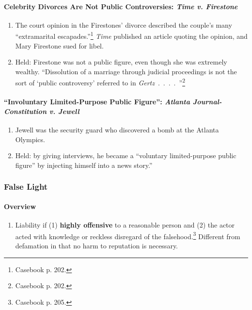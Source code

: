 \paragraph{Celebrity Divorces Are Not Public Controversies: \emph{Time v.  
Firestone}}

\begin{enumerate}
    \item The court opinion in the Firestones' divorce described the couple's 
    many ``extramarital escapades.''\footnote{Casebook p. 202.} \emph{Time} 
    published an article quoting the opinion, and Mary Firestone sued for libel.
    \item Held: Firestone was not a public figure, even though she was extremely 
    wealthy. ``Dissolution of a marriage through judicial proceedings is not the 
    sort of `public controversy' referred to in 
    \emph{Gertz}~.~.~.~.~''\footnote{Casebook p. 202.}
\end{enumerate}

\paragraph{``Involuntary Limited-Purpose Public Figure'': \emph{Atlanta 
Journal-Constitution v. Jewell}}

\begin{enumerate}
    \item Jewell was the security guard who discovered a bomb at the Atlanta 
    Olympics.
    \item Held: by giving interviews, he became a ``voluntary limited-purpose 
    public figure'' by injecting himself into a news story.''
\end{enumerate}

\subsubsection{False Light}

\paragraph{Overview}

\begin{enumerate}
    \item Liability if (1) \textbf{highly offensive} to a reasonable person and 
    (2) the actor acted with knowledge or reckless disregard of the 
    falsehood.\footnote{Casebook p. 205.} Different from defamation in that no 
    harm to reputation is necessary.
\end{enumerate}

